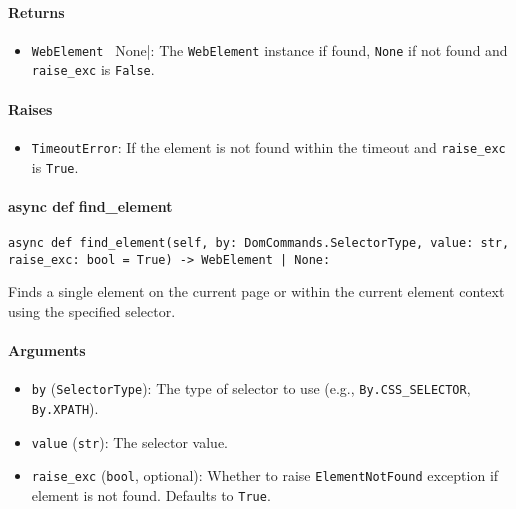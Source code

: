 \documentclass{article}
\begin{document}
\paragraph{Returns}

\begin{itemize}
    \item \lstinline[style=pythonstyle]|WebElement | None|: The \lstinline[style=pythonstyle]|WebElement| instance if found, \lstinline[style=pythonstyle]|None| if not found and \lstinline[style=pythonstyle]|raise_exc| is \lstinline[style=pythonstyle]|False|.
\end{itemize}

\paragraph{Raises}

\begin{itemize}
    \item \lstinline[style=pythonstyle]|TimeoutError|: If the element is not found within the timeout and \lstinline[style=pythonstyle]|raise_exc| is \lstinline[style=pythonstyle]|True|.
\end{itemize}

\paragraph{async def find\_element}

\begin{lstlisting}[style=pythonstyle]
async def find_element(self, by: DomCommands.SelectorType, value: str, raise_exc: bool = True) -> WebElement | None:
\end{lstlisting}

\noindent Finds a single element on the current page or within the current element context using the specified selector.

\paragraph{Arguments}

\begin{itemize}
    \item \lstinline[style=pythonstyle]|by| (\lstinline[style=pythonstyle]|SelectorType|): The type of selector to use (e.g., \lstinline[style=pythonstyle]|By.CSS_SELECTOR|, \lstinline[style=pythonstyle]|By.XPATH|).
    \item \lstinline[style=pythonstyle]|value| (\lstinline[style=pythonstyle]|str|): The selector value.
    \item \lstinline[style=pythonstyle]|raise_exc| (\lstinline[style=pythonstyle]|bool|, optional): Whether to raise \lstinline[style=pythonstyle]|ElementNotFound| exception if element is not found. Defaults to \lstinline[style=pythonstyle]|True|.
\end{itemize}
\end{document}
